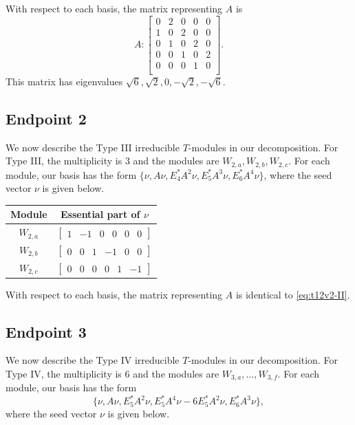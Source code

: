\documentclass[12pt,letterpaper]{article}
\newcommand{\rowvector}[1]{\begin{bmatrix} #1 \end{bmatrix}}
\begin{document}
With respect to each basis, the matrix representing $A$ is 
\begin{equation}
    A: \begin{bmatrix}
 0 & 2 & 0 & 0 & 0 \\
 1 & 0 & 2 & 0 & 0 \\
 0 & 1 & 0 & 2 & 0 \\
 0 & 0 & 1 & 0 & 2 \\
 0 & 0 & 0 & 1 & 0 \\
\end{bmatrix}.
\label{eq:t12v2-II}
\end{equation}
This matrix has eigenvalues $\sqrt{6}, \sqrt{2}, 0, -\sqrt{2}, -\sqrt{6}$.

\subsection{Endpoint 2}

We now describe the Type III irreducible $T$-modules in our decomposition.
For Type III, the multiplicity is 3 and the modules are $W_{2,a},W_{2,b},W_{2,c}$.
For each module, our basis has the form $\{\nu, A\nu, E_4^*A^2\nu, E_5^*A^3\nu, E_6^*A^4\nu\}$, where the seed vector $\nu$ is given below.

\begin{center}
    \begin{tabular}{c | c}
    \toprule
       \textbf{Module}  & \textbf{Essential part of }$\nu$ \\
       \midrule
       $W_{2,a}$  & $\rowvector{1 & -1 & 0 & 0 & 0 & 0}$ \\[1.67pt]
       $W_{2,b}$  & $\rowvector{0 & 0 & 1 & -1 & 0 & 0}$ \\[1.67pt]
       $W_{2,c}$  & $\rowvector{0 & 0 & 0 & 0 & 1 & -1}$ \\
    \bottomrule
    \end{tabular}
\end{center}

With respect to each basis, the matrix representing $A$ is identical to \eqref{eq:t12v2-II}.

\subsection{Endpoint 3}

We now describe the Type IV irreducible $T$-modules in our decomposition.
For Type IV, the multiplicity is 6 and the modules are $W_{3,a},\dots,W_{3,f}$.
For each module, our basis has the form $$\{\nu, A\nu, E_5^*A^2\nu,E_5^*A^4\nu - 6E_5^*A^2\nu, E_6^*A^3\nu \},$$ where the seed vector $\nu$ is given below.
\end{document}
